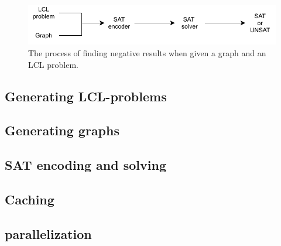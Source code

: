 \begin{figure}[h]
\centering
\includegraphics[]{diagrams/implementation_idea_diagram.pdf}
\caption{The process of finding negative results when given a graph and an LCL problem.}
\label{fig:implementatio:idea:1}
\end{figure}




\subsection{Generating LCL-problems}
\subsection{Generating graphs}
\subsection{SAT encoding and solving}
\subsection{Caching}

\subsection{parallelization}


